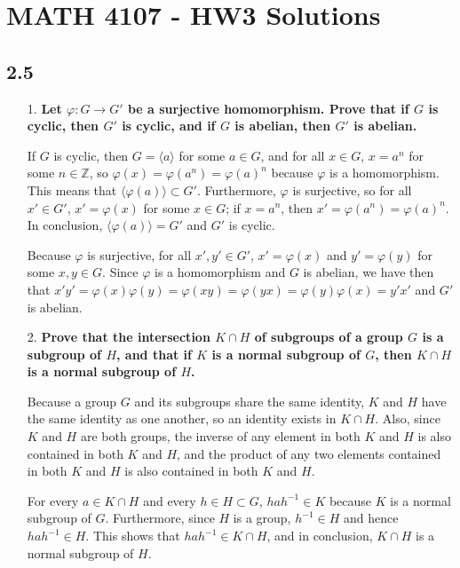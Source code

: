 \documentclass[a4paper,12pt]{article}
\begin{document}
\section*{MATH 4107 - HW3 Solutions}

\subsection*{2.5}
\begin{enumerate}
    \item[1.]
        \boldmath
        \textbf{Let $\varphi \colon G \to G'$ be a surjective homomorphism. Prove that if $G$ is cyclic, then $G'$ is cyclic, and if $G$ is abelian, then $G'$ is abelian.} \par
        \unboldmath
        If $G$ is cyclic, then $G = \langle a \rangle$ for some $a \in G$, and for all $x \in G$, $x = a^n$ for some $n \in \mathbb{Z}$, so $\varphi(x) = \varphi(a^n) = \varphi(a)^n$ because $\varphi$ is a homomorphism. This means that $\langle \varphi(a) \rangle \subset G'$. Furthermore, $\varphi$ is surjective, so for all $x' \in G'$, $x' = \varphi(x)$ for some $x \in G$; if $x = a^n$, then $x' = \varphi(a^n) = \varphi(a)^n$. In conclusion, $\langle \varphi(a) \rangle = G'$ and $G'$ is cyclic. \par
        Because $\varphi$ is surjective, for all $x', y' \in G'$, $x' = \varphi(x)$ and $y' = \varphi(y)$ for some $x, y \in G$. Since $\varphi$ is a homomorphism and $G$ is abelian, we have then that $x'y' = \varphi(x) \varphi(y) = \varphi(xy) = \varphi(yx) = \varphi(y) \varphi(x) = y'x'$ and $G'$ is abelian.

    \item[2.]
        \boldmath
        \textbf{Prove that the intersection $K \cap H$ of subgroups of a group $G$ is a subgroup of $H$, and that if $K$ is a normal subgroup of $G$, then $K \cap H$ is a normal subgroup of $H$.} \par
        \unboldmath
        Because a group $G$ and its subgroups share the same identity, $K$ and $H$ have the same identity as one another, so an identity exists in $K \cap H$. Also, since $K$ and $H$ are both groups, the inverse of any element in both $K$ and $H$ is also contained in both $K$ and $H$, and the product of any two elements contained in both $K$ and $H$ is also contained in both $K$ and $H$. \par
        For every $a \in K \cap H$ and every $h \in H \subset G$, $hah^{-1} \in K$ because $K$ is a normal subgroup of $G$. Furthermore, since $H$ is a group, $h^{-1} \in H$ and hence $hah^{-1} \in H$. This shows that $hah^{-1} \in K \cap H$, and in conclusion, $K \cap H$ is a normal subgroup of $H$.


\end{enumerate}
\end{document}
